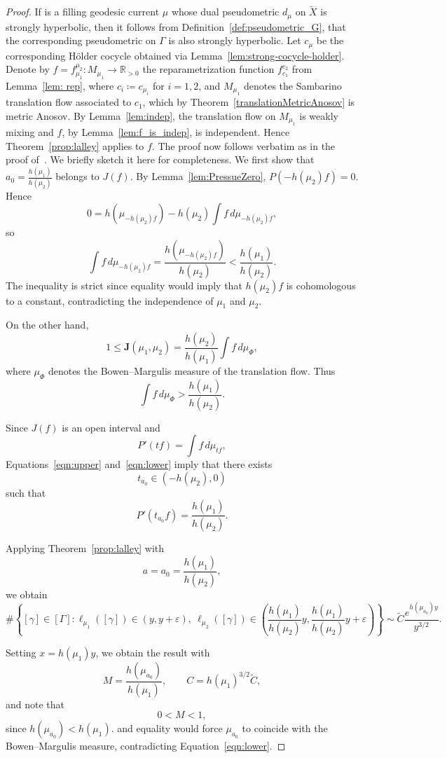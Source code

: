 \documentclass[12pt]{amsart}
\numberwithin{equation}{section}
\numberwithin{figure}{section}
\theoremstyle{definition}
\theoremstyle{plain}
\newcommand*{\wt}[1]{\widetilde{#1}}
\begin{document}
\begin{proof}
If is a filling geodesic current $\mu$ whose dual pseudometric $d_\mu$ on $\wt{X}$ is strongly hyperbolic, then it follows from Definition~\ref{def:pseudometric_G}, that the corresponding pseudometric on $\Gamma$ is also strongly hyperbolic.
Let $c_\mu$ be the corresponding H\"older cocycle obtained via Lemma~\ref{lem:strong-cocycle-holder}.
Denote by
$f=f_{\mu_1}^{\mu_2}:M_{\mu_1}\to\mathbb R_{>0}$ the reparametrization function $f_{c_1}^{c_2}$ from Lemma~\ref{lem: rep}, where $c_i \coloneqq c_{\mu_i}$ for $i=1,2$, and $M_{\mu_1}$ denotes the Sambarino translation flow associated to $c_1$, which by Theorem~\ref{translationMetricAnosov} is metric Anosov.
By Lemma~\ref{lem:indep}, the translation flow on $M_{\mu_1}$ is weakly mixing and $f$, by Lemma~\ref{lem:f_is_indep}, is independent. Hence Theorem~\ref{prop:lalley} applies to $f$. The proof now follows verbatim as in the proof of~\cite[Theorem~1.1]{DM23:Correlation}. We briefly sketch it here for completeness. We first show that
$a_0=\frac{h(\mu_1)}{h(\mu_2)}$ belongs to $J(f)$.
By Lemma~\ref{lem:PressueZero},  $P(-h(\mu_2)f)=0.$
Hence
\[
0
=
h(\mu_{-h(\mu_2)f})
-
h(\mu_2)\int f\,d\mu_{-h(\mu_2)f},
\]
so
\begin{equation}
\label{eqn:upper}
\int f\,d\mu_{-h(\mu_2)f}
=
\frac{h(\mu_{-h(\mu_2)f})}{h(\mu_2)}
<
\frac{h(\mu_1)}{h(\mu_2)}.
\end{equation}
The inequality is strict since equality would imply that $h(\mu_2)f$ is cohomologous to a constant, contradicting the independence of $\mu_1$ and $\mu_2$.

On the other hand,
\[
1
\leq
\mathbf J(\mu_1,\mu_2)
=
\frac{h(\mu_2)}{h(\mu_1)}
\int f\,d\mu_\Phi,
\]
where $\mu_\Phi$ denotes the Bowen--Margulis measure of the translation flow. Thus
\begin{equation}
\label{eqn:lower}
\int f\,d\mu_\Phi
>
\frac{h(\mu_1)}{h(\mu_2)}.
\end{equation}

Since $J(f)$ is an open interval and
\[
P'(tf)=\int f\,d\mu_{tf},
\]
Equations~\eqref{eqn:upper} and~\eqref{eqn:lower} imply that there exists
\[
t_{a_0}\in(-h(\mu_2),0)
\]
such that
\[
P'(t_{a_0}f)
=
\frac{h(\mu_1)}{h(\mu_2)}.
\]

Applying Theorem~\ref{prop:lalley} with
\[
a=a_0=\frac{h(\mu_1)}{h(\mu_2)},
\]
we obtain
\[
\#\left\{
[\gamma]\in[\Gamma]:
\ell_{\mu_1}([\gamma])\in(y,y+\varepsilon),
\
\ell_{\mu_2}([\gamma])
\in
\left(
\frac{h(\mu_1)}{h(\mu_2)}y,
\frac{h(\mu_1)}{h(\mu_2)}y+\varepsilon
\right)
\right\}
\sim
\widetilde C
\frac{e^{h(\mu_{a_0})y}}{y^{3/2}}.
\]

Setting \(x=h(\mu_1)y\), we obtain the result with
\[
M=\frac{h(\mu_{a_0})}{h(\mu_1)},
\qquad
C=h(\mu_1)^{3/2}\widetilde C,
\]
and note that
\[
0<M<1,
\]
since \(h(\mu_{a_0})<h(\mu_1)\).
and equality would force $\mu_{a_0}$ to coincide with the Bowen--Margulis measure, contradicting Equation~\eqref{eqn:lower}.
\end{proof}
\end{document}
